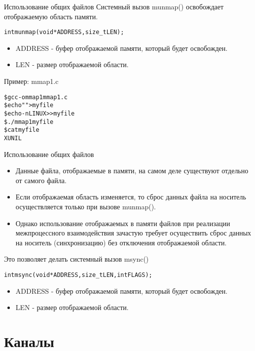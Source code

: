 \documentclass{beamer}
\begin{document}
\begin{frame}[fragile]{Использование общих файлов}
Системный вызов munmap() освобождает отображаемую область памяти.
\begin{alltt}
int munmap (void * ADDRESS, size_t LEN);
\end{alltt}
\begin{itemize}
\item ADDRESS - буфер отображаемой памяти, который будет освобожден.
\item LEN - размер отображаемой области.
\end{itemize}
Пример: mmap1.c
\begin{alltt}
\$ gcc -o mmap1 mmap1.c
\$ echo "" > myfile
\$ echo -n LINUX >> myfile
\$ ./mmap1 myfile
\$ cat myfile
XUNIL
\end{alltt}
\end{frame}

\begin{frame}[fragile]{Использование общих файлов}
\begin{itemize}
\item Данные файла, отображаемые в памяти, на самом деле существуют отдельно от самого файла. 
\item Если отображаемая область изменяется, то сброс данных файла на носитель осуществляется только при вызове munmap(). 
\item Однако использование отображаемых в памяти файлов при реализации межпроцессного взаимодействия зачастую требует осуществить сброс данных на носитель (синхронизацию) без отключения отображаемой области.
\end{itemize}
Это позволяет делать системный вызов msync()
\begin{alltt}
int msync (void * ADDRESS, size_t LEN, int FLAGS);
\end{alltt}
\begin{itemize}
\item ADDRESS - буфер отображаемой памяти, который будет освобожден.
\item LEN - размер отображаемой области.
\end{itemize}
\end{frame}

\section{Каналы}
\end{document}
